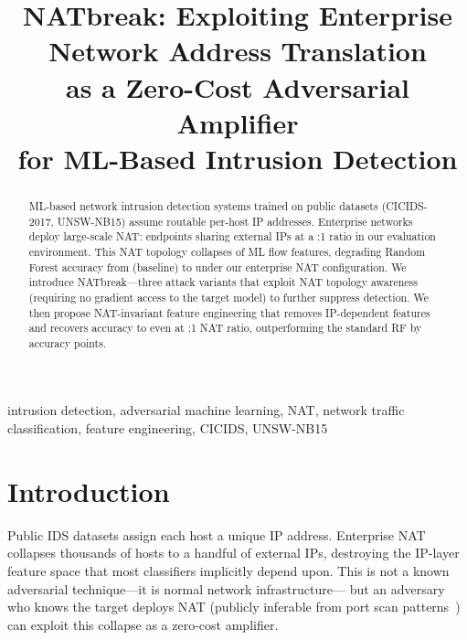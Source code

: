 \documentclass[conference]{IEEEtran}
\begin{document}
\title{NATbreak: Exploiting Enterprise Network Address Translation\\
as a Zero-Cost Adversarial Amplifier\\
for ML-Based Intrusion Detection}

\author{
}

\maketitle

\begin{abstract}
ML-based network intrusion detection systems trained on public datasets
(CICIDS-2017, UNSW-NB15) assume routable per-host IP addresses.
Enterprise networks deploy large-scale NAT: \SifiNEndpoints{} endpoints
sharing \SifiNExternalIps{} external IPs at a \NatRatioLarge{}:1 ratio
in our evaluation environment.
This NAT topology collapses \NIPFeatures{} of \NTotalFeatures{} ML flow
features, degrading Random Forest accuracy from \RfBaselineAcc{} (baseline)
to \TheoremOneRfNatAcc{} under our enterprise NAT configuration.
We introduce NATbreak---three attack variants that exploit NAT topology
awareness (requiring no gradient access to the target model) to further
suppress detection.
We then propose NAT-invariant feature engineering that removes IP-dependent
features and recovers accuracy to \InvRfAccAtSifi{} even at
\NatRatioLarge{}:1 NAT ratio, outperforming the standard RF
by \AccGainInvariant{} accuracy points.
\end{abstract}

\begin{IEEEkeywords}
intrusion detection, adversarial machine learning, NAT, network traffic
classification, feature engineering, CICIDS, UNSW-NB15
\end{IEEEkeywords}

\section{Introduction}

Public IDS datasets assign each host a unique IP address.
Enterprise NAT collapses thousands of hosts to a handful of external IPs,
destroying the IP-layer feature space that most classifiers implicitly depend
upon.
This is not a known adversarial technique---it is normal network infrastructure---
but an adversary who knows the target deploys NAT (publicly inferable from port
scan patterns~\cite{RFC3022}) can exploit this collapse as a zero-cost
amplifier.
\end{document}
